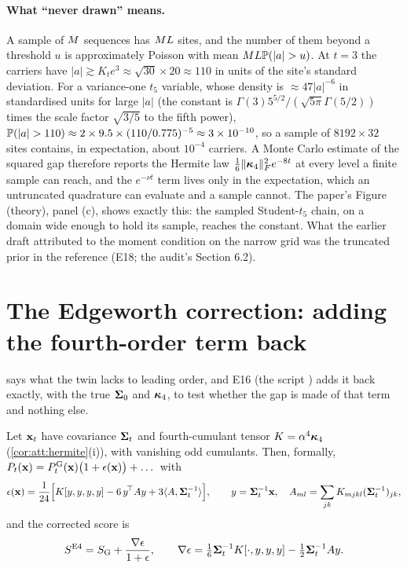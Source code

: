 \paragraph{What ``never drawn'' means.} A sample of $M$ sequences has $ML$
sites, and the number of them beyond a threshold $u$ is approximately Poisson with
mean $\nseq\nsites\Prob(|a|>u)$. At $t=3$ the carriers have $|a|\gtrsim K_te^{3}\approx\sqrt{30}\times20\approx110$
in units of the site's standard deviation. For a variance-one $t_5$ variable, whose
density is $\approx47|a|^{-6}$ in standardised units for large $|a|$ (the constant is
$\Gamma(3)5^{5/2}/(\sqrt{5\pi}\Gamma(5/2))$ times the scale factor $\sqrt{3/5}$ to the
fifth power), $\Prob(|a|>110)\approx2\times9.5\times(110/0.775)^{-5}\approx3\times10^{-10}$,
so a sample of $8192\times32$ sites contains, in expectation, about $10^{-4}$ carriers.
A Monte Carlo estimate of the squared gap therefore reports the Hermite law
$\tfrac16\lVert \bm{\kappa}_4 \rVert_{F}^2e^{-8t}$ at every level a finite sample can reach, and the
$e^{-\nu t}$ term lives only in the expectation, which an untruncated quadrature can
evaluate and a sample cannot. The paper's Figure (theory), panel (c), shows exactly
this: the sampled Student-$t_5$ chain, on a domain wide enough to hold its sample,
reaches the constant. What the earlier draft attributed to the moment condition on the
narrow grid was the truncated prior in the reference (E18; the audit's Section 6.2).

\section{The Edgeworth correction: adding the fourth-order term back}
\label{sec:att:edgeworth}

 says what the twin lacks to leading order, and E16
(the script ) adds it back exactly, with the true
$\mathbf{\Sigma}_0$ and $\bm{\kappa}_4$, to test whether the gap is made of that term and nothing
else.

\begin{proposition}
\label{prop:att:edgeworth}
Let $\mathbf{x}_t$ have covariance $\mathbf{\Sigma}_t$ and fourth-cumulant tensor $K=\alpha^4\bm{\kappa}_4$
(\cref{cor:att:hermite}(i)), with vanishing odd cumulants. Then, formally,
$P_t(\mathbf{x})=P^{\mathrm G}_t(\mathbf{x})\bigl(1+\epsilon(\mathbf{x})\bigr)+\dots$ with
\begin{equation}
  \epsilon(\mathbf{x})=\frac1{24}\Bigl[K[y,y,y,y]-6\,y^{\!\top}Ay+3\langle A,\mathbf{\Sigma}_t^{-1}\rangle\Bigr],\qquad
  y=\mathbf{\Sigma}_t^{-1}\mathbf{x},\quad A_{ml}=\sum_{jk}K_{mjkl}(\mathbf{\Sigma}_t^{-1})_{jk},
  \label{eq:att:eps}
\end{equation}
and the corrected score is
\begin{equation}
  S^{\mathrm{E4}}=S_{\mathrm{G}}+\frac{\nabla\epsilon}{1+\epsilon},\qquad
  \nabla\epsilon=\tfrac16\mathbf{\Sigma}_t^{-1}K[\cdot,y,y,y]-\tfrac12\mathbf{\Sigma}_t^{-1}Ay .
  \label{eq:att:e4score}
\end{equation}
\end{proposition}

